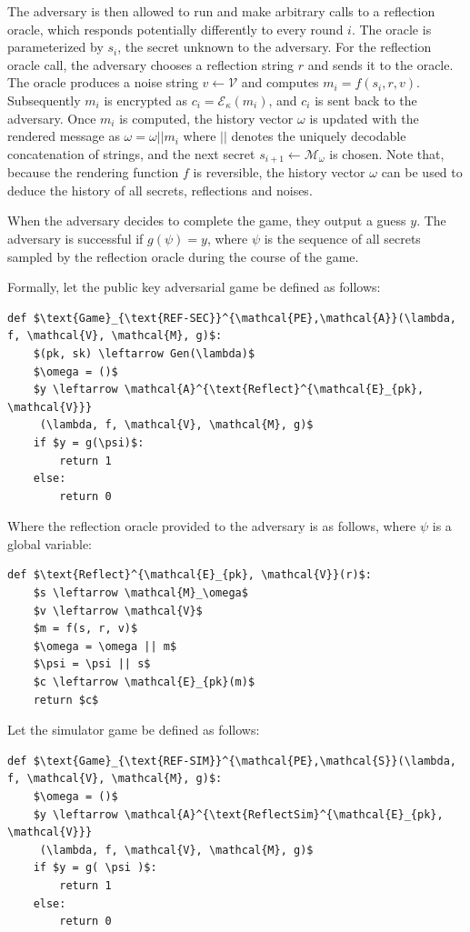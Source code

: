 \documentclass[conference, letterpaper, 10pt]{IEEEtran}
\begin{document}
The adversary is then allowed to run and make arbitrary calls to a reflection
oracle, which responds potentially differently to every round $i$. The oracle
is parameterized by $s_i$, the secret unknown to the
adversary.  For the reflection oracle call, the adversary chooses a reflection
string $r$ and sends it to the oracle. The oracle produces a noise string
$v \leftarrow \mathcal{V}$ and computes $m_i = f(s_i, r, v)$. Subsequently
$m_i$ is encrypted as $c_i = \mathcal{E}_\kappa(m_i)$, and $c_i$ is sent back
to the adversary. Once $m_i$ is computed, the history vector $\omega$ is updated
with the rendered message as $\omega = \omega || m_i$ where $||$ denotes the
uniquely decodable concatenation of strings, and the next secret $s_{i+1}
\leftarrow \mathcal{M}_\omega$ is chosen. Note that, because the rendering
function $f$ is reversible, the history vector $\omega$ can be used to deduce
the history of all secrets, reflections and noises.

When the adversary decides to complete the game, they output a guess $y$. The
adversary is successful if $g(\psi) = y$, where $\psi$ is the sequence
of all secrets sampled by the reflection oracle during the course of the game.

Formally, let the public key adversarial game be defined as follows:

\begin{lstlisting}[texcl,mathescape,basicstyle=\small]
def $\text{Game}_{\text{REF-SEC}}^{\mathcal{PE},\mathcal{A}}(\lambda, f, \mathcal{V}, \mathcal{M}, g)$:
    $(pk, sk) \leftarrow Gen(\lambda)$
    $\omega = ()$
    $y \leftarrow \mathcal{A}^{\text{Reflect}^{\mathcal{E}_{pk}, \mathcal{V}}}
     (\lambda, f, \mathcal{V}, \mathcal{M}, g)$
    if $y = g(\psi)$:
        return 1
    else:
        return 0
\end{lstlisting}

Where the reflection oracle provided to the adversary is as follows, where
$\psi$ is a global variable:

\begin{lstlisting}[texcl,mathescape,basicstyle=\small]
def $\text{Reflect}^{\mathcal{E}_{pk}, \mathcal{V}}(r)$:
    $s \leftarrow \mathcal{M}_\omega$
    $v \leftarrow \mathcal{V}$
    $m = f(s, r, v)$
    $\omega = \omega || m$
    $\psi = \psi || s$
    $c \leftarrow \mathcal{E}_{pk}(m)$
    return $c$
\end{lstlisting}

Let the simulator game be defined as follows:

\begin{lstlisting}[texcl,mathescape,basicstyle=\small]
def $\text{Game}_{\text{REF-SIM}}^{\mathcal{PE},\mathcal{S}}(\lambda, f, \mathcal{V}, \mathcal{M}, g)$:
    $\omega = ()$
    $y \leftarrow \mathcal{A}^{\text{ReflectSim}^{\mathcal{E}_{pk}, \mathcal{V}}}
     (\lambda, f, \mathcal{V}, \mathcal{M}, g)$
    if $y = g( \psi )$:
        return 1
    else:
        return 0
\end{lstlisting}
\end{document}
